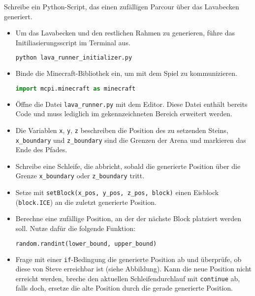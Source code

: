 \large Schreibe ein Python-Script, das einen zufälligen Parcour über das Lavabecken generiert.
\begin{itemize}
	\item Um das Lavabecken und den restlichen Rahmen zu generieren, führe das Initiliasierungsscript im Terminal aus.
	\begin{lstlisting}[language=sh]
python lava_runner_initializer.py
	\end{lstlisting}
	\item Binde die Minecraft-Bibliothek ein, um mit dem Spiel zu kommunizieren.
	\begin{lstlisting}[language=Python]
import mcpi.minecraft as minecraft
	\end{lstlisting}
	
	\item Öffne die Datei \texttt{lava\_runner.py} mit dem Editor. Diese Datei enthält bereits Code und muss lediglich im gekennzeichneten Bereich erweitert werden.
	
	\item Die Variablen \texttt{x}, \texttt{y}, \texttt{z} beschreiben die Position des zu setzenden Steins, \texttt{x\_boundary} und \texttt{z\_boundary} sind die Grenzen der Arena und markieren das Ende des Pfades.
	
	\item Schreibe eine Schleife, die abbricht, sobald die generierte Position über die Grenze \texttt{x\_boundary} oder \texttt{z\_boundary} tritt.

	\item Setze mit \texttt{setBlock(x\_pos, y\_pos, z\_pos, block)}  einen Eisblock (\texttt{block.ICE}) an die zuletzt generierte Position.

	\item Berechne eine zufällige Position, an der der nächste Block platziert werden soll. Nutze dafür die folgende Funktion:
		\begin{lstlisting}[language=Python]
random.randint(lower_bound, upper_bound)
		\end{lstlisting}
		
	\item Frage mit einer \texttt{if}-Bedingung die generierte Position ab und überprüfe, ob diese von Steve erreichbar ist (siehe Abbildung). Kann die neue Position nicht erreicht werden, breche den aktuellen Schleifendurchlauf mit \texttt{continue} ab, falls doch, ersetze die alte Position durch die gerade generierte Position.
\end{itemize}